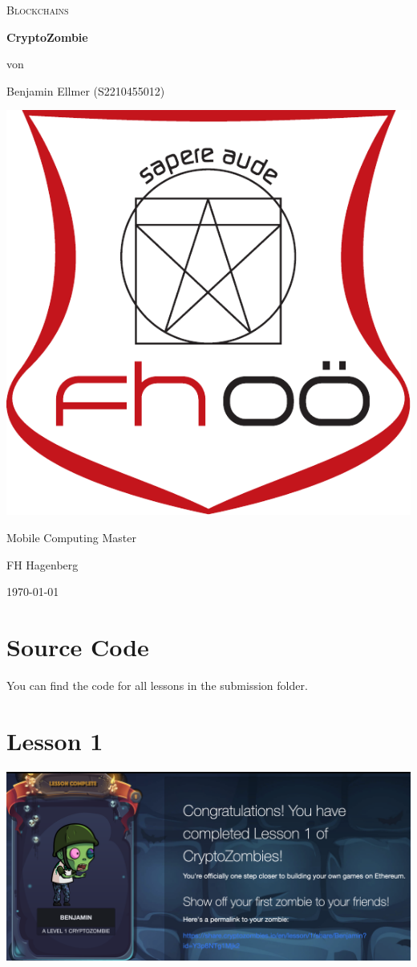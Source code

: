 \documentclass[14pt,a4paper]{extarticle}
\begin{document}
	\begin{titlepage}
		\centering
		{\scshape\LARGE Blockchains \par}
		\vspace{2.5cm}
		{\huge\bfseries CryptoZombie}
		\vfill
		{\normalsize von\par}
		{\normalsize Benjamin Ellmer (\textsc{S2210455012}) \par}
		\vspace{1cm}
		\includegraphics[width=0.3\textheight]{images/logo.pdf} \par
		\vspace{1cm}
		{\large Mobile Computing Master \par}
		{\large FH Hagenberg \par}
		\vfill
		{\large \today\par}
	\end{titlepage}

	\section*{Source Code}
	You can find the code for all lessons in the submission folder.

	\section*{Lesson 1}
	\includegraphics[width=\textwidth]{images/lesson1.png}
\end{document}
